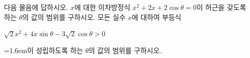 다음 물음에 답하시오.
 $x$에 대한 이차방정식 $x^2+2x+2\cos\theta=0$이 허근을 갖도록 하는 $\theta$의 값의 범위를 구하시오. \cond{$0\le\theta\le\pi$}
 모든 실수 $x$에 대하여 부등식 \par\smallskip\centerline{$\sqrt{2}x^2+4x\sin\theta-3\sqrt{2}\cos\theta>0$}\par\smallskip\noindent\hangindent=1.6em\relax 이 성립하도록 하는 $\theta$의 값의 범위를 구하시오. \cond{$0\le\theta\le 2\pi$}
